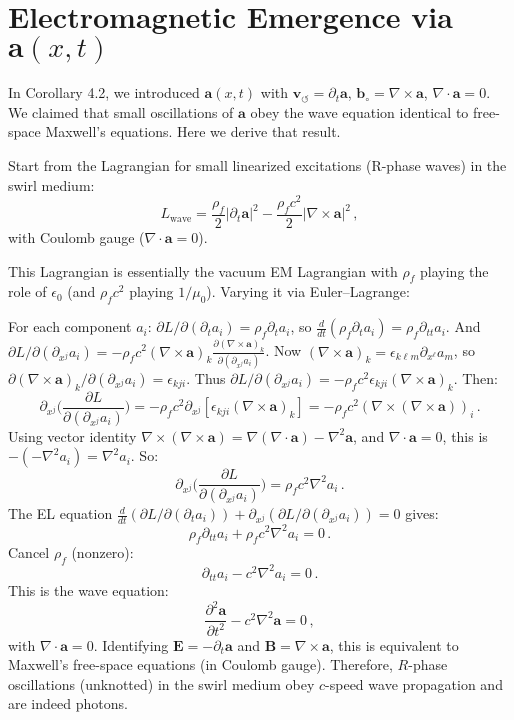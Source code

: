 \documentclass[aps,onecolumn,10pt,nofootinbib]{revtex4}
\newcommand{\swirlarrow}{\circlearrowleft} %
\newcommand{\vswirl}{\mathbf{v}_{\!\swirlarrow}}     %
\begin{document}
	\section{Electromagnetic Emergence via $\mathbf{a}(x,t)$}
	In Corollary 4.2, we introduced $\mathbf{a}(x,t)$ with $\vswirl = \partial_t \mathbf{a}$, $\mathbf{b}_{\circ} = \nabla \times \mathbf{a}$, $\nabla \cdot \mathbf{a}=0$. We claimed that small oscillations of $\mathbf{a}$ obey the wave equation identical to free-space Maxwell’s equations. Here we derive that result.

	Start from the Lagrangian for small linearized excitations (R-phase waves) in the swirl medium:
	\[
		L_{\text{wave}} = \frac{\rho_f}{2}|\partial_t \mathbf{a}|^2 - \frac{\rho_f c^2}{2}|\nabla \times \mathbf{a}|^2\,,
	\]
	with Coulomb gauge ($\nabla \cdot \mathbf{a}=0$).

	This Lagrangian is essentially the vacuum EM Lagrangian with $\rho_f$ playing the role of $\epsilon_0$ (and $\rho_f c^2$ playing $1/\mu_0$). Varying it via Euler–Lagrange:

	For each component $a_i$: $\partial L/\partial(\partial_t a_i) = \rho_f \partial_t a_i$, so $\frac{d}{dt}(\rho_f \partial_t a_i) = \rho_f \partial_{tt} a_i$. And $\partial L/\partial(\partial_{x^j} a_i) = -\rho_f c^2 (\nabla \times \mathbf{a})_k \frac{\partial (\nabla \times \mathbf{a})_k}{\partial(\partial_{x^j}a_i)}$. Now $(\nabla \times \mathbf{a})_k = \epsilon_{k\ell m}\partial_{x^\ell} a_m$, so $\partial(\nabla \times \mathbf{a})_k/\partial(\partial_{x^j}a_i) = \epsilon_{kji}$. Thus $\partial L/\partial(\partial_{x^j} a_i) = -\rho_f c^2 \epsilon_{kji}(\nabla \times \mathbf{a})_k$. Then:
	\[
		\partial_{x^j}\Big(\frac{\partial L}{\partial(\partial_{x^j} a_i)}\Big) = -\rho_f c^2 \partial_{x^j}[\epsilon_{kji}(\nabla \times \mathbf{a})_k] = -\rho_f c^2 (\nabla \times (\nabla \times \mathbf{a}))_i\,.
	\]
	Using vector identity $\nabla \times (\nabla \times \mathbf{a}) = \nabla(\nabla\cdot\mathbf{a}) - \nabla^2 \mathbf{a}$, and $\nabla\cdot\mathbf{a}=0$, this is $-(-\nabla^2 a_i) = \nabla^2 a_i$. So:
	\[
		\partial_{x^j}\Big(\frac{\partial L}{\partial(\partial_{x^j} a_i)}\Big) = \rho_f c^2 \nabla^2 a_i\,.
	\]
	The EL equation $\frac{d}{dt}(\partial L/\partial(\partial_t a_i)) + \partial_{x^j}(\partial L/\partial(\partial_{x^j}a_i))=0$ gives:
	\[
		\rho_f \partial_{tt} a_i + \rho_f c^2 \nabla^2 a_i = 0\,.
	\]
	Cancel $\rho_f$ (nonzero):
	\[
		\partial_{tt} a_i - c^2 \nabla^2 a_i = 0\,.
	\]
	This is the wave equation:
	\[
		\frac{\partial^2 \mathbf{a}}{\partial t^2} - c^2 \nabla^2 \mathbf{a} = 0\,,
	\]
	with $\nabla\cdot\mathbf{a}=0$. Identifying $\mathbf{E} = -\partial_t \mathbf{a}$ and $\mathbf{B}=\nabla\times\mathbf{a}$, this is equivalent to Maxwell’s free-space equations (in Coulomb gauge). Therefore, $R$-phase oscillations (unknotted) in the swirl medium obey $c$-speed wave propagation and are indeed photons.
\end{document}
